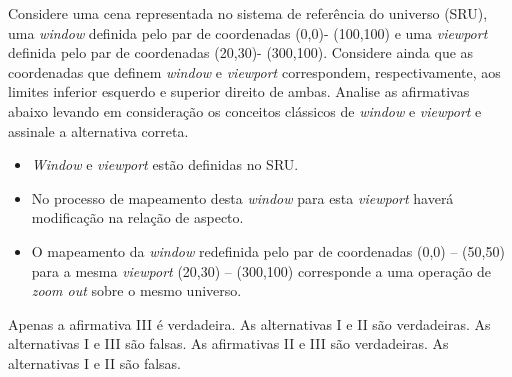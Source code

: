 \documentclass[12pt, addpoints]{exam}
\begin{document}
    \begin{questions}

    \newpage
    \question

Considere uma cena representada no sistema de referência do universo (SRU), uma \textit{window} definida pelo par de coordenadas (0,0)- (100,100) e uma \textit{viewport} definida pelo par de coordenadas (20,30)- (300,100). Considere ainda que as coordenadas que definem \textit{window} e \textit{viewport} correspondem, respectivamente, aos limites inferior esquerdo e superior direito de ambas. Analise as afirmativas abaixo levando em consideração os conceitos clássicos de \textit{window} e \textit{viewport} e assinale a alternativa correta.



\begin{itemize}

    \item[I)] \textit{Window} e \textit{viewport} estão definidas no SRU.

    \item[II)] No processo de mapeamento desta \textit{window} para esta \textit{viewport} haverá modificação na relação de aspecto.

    \item[III)] O mapeamento da \textit{window} redefinida pelo par de coordenadas (0,0) – (50,50) para a mesma \textit{viewport} (20,30) – (300,100) corresponde a uma operação de \textit{zoom out} sobre o mesmo universo.

\end{itemize}
\begin{choices}
\choice Apenas a afirmativa III é verdadeira.
\choice As alternativas I e II são verdadeiras.
\choice As alternativas I e III são falsas.
\choice As afirmativas II e III são verdadeiras.
\choice As alternativas I e II são falsas.
\end{choices}



    \end{questions}
    
\end{document}
